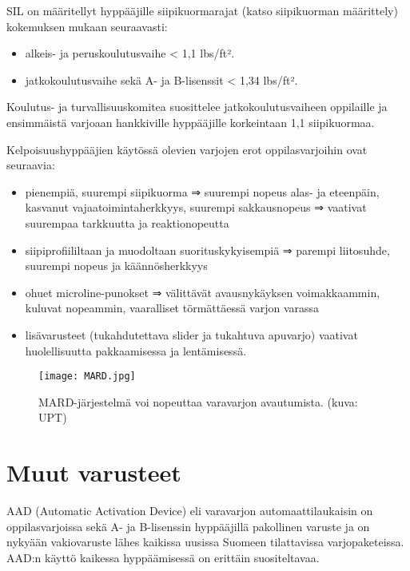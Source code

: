 SIL on määritellyt hyppääjille siipikuormarajat (katso siipikuorman määrittely) kokemuksen mukaan seuraavasti: 

\begin{itemize}
\item  alkeis- ja peruskoulutusvaihe < 1,1 lbs/ft². 
\item  jatkokoulutusvaihe sekä A- ja B-lisenssit < 1,34 lbs/ft². 
\end{itemize}

Koulutus- ja turvallisuuskomitea suosittelee jatkokoulutusvaiheen oppilaille ja ensimmäistä varjoaan hankkiville hyppääjille korkeintaan 1,1 siipikuormaa. 


Kelpoisuushyppääjien käytössä olevien varjojen erot oppilasvarjoihin ovat seuraavia: 

\begin{itemize}
\item  pienempiä, suurempi siipikuorma ⇒ suurempi nopeus alas- ja eteenpäin, kasvanut vajaatoimintaherkkyys, suurempi sakkausnopeus ⇒ vaativat suurempaa tarkkuutta ja reaktionopeutta 
\item  siipiprofiililtaan ja muodoltaan suorituskykyisempiä ⇒ parempi liitosuhde, suurempi nopeus ja käännösherkkyys 
\item  ohuet microline-punokset ⇒ välittävät avausnykäyksen voimakkaammin, kuluvat nopeammin, vaaralliset törmättäessä varjon varassa 
\item  lisävarusteet (tukahdutettava slider ja tukahtuva apuvarjo) vaativat huolellisuutta pakkaamisessa ja lentämisessä. 
\end{itemize}

\begin{figure*}[]\centering\texttt{[image: MARD.jpg]}\caption{MARD-järjestelmä voi nopeuttaa varavarjon avautumista. (kuva: UPT)}\end{figure*} 

\section{ Muut varusteet }
\label{omiin-varusteisiin-siirtyminen-muut-varusteet}


AAD (Automatic Activation Device) eli varavarjon automaattilaukaisin on oppilasvarjoissa sekä A- ja B-lisenssin hyppääjillä pakollinen varuste ja on nykyään vakiovaruste lähes kaikissa uusissa Suomeen tilattavissa varjopaketeissa. AAD:n käyttö kaikessa hyppäämisessä on erittäin suositeltavaa.  


